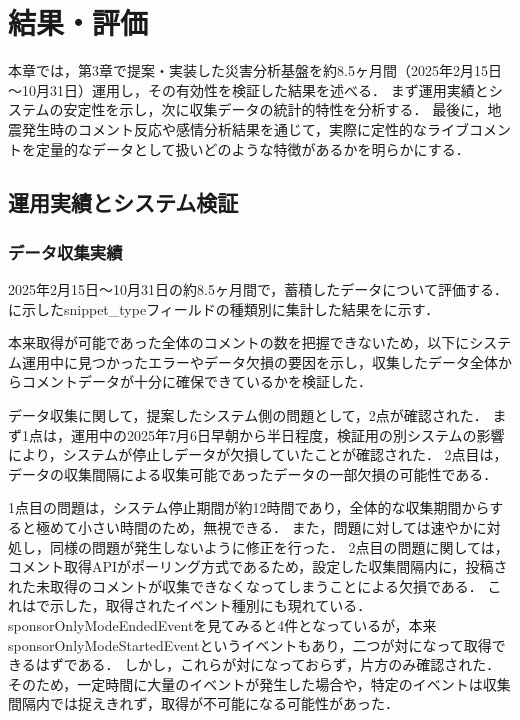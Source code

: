 \chapter{結果・評価}

本章では，第3章で提案・実装した災害分析基盤を約8.5ヶ月間（2025年2月15日～10月31日）運用し，その有効性を検証した結果を述べる．
まず運用実績とシステムの安定性を示し，次に収集データの統計的特性を分析する．
最後に，地震発生時のコメント反応や感情分析結果を通じて，実際に定性的なライブコメントを定量的なデータとして扱いどのような特徴があるかを明らかにする．
\section{運用実績とシステム検証}

\subsection{データ収集実績}

2025年2月15日〜10月31日の約8.5ヶ月間で，蓄積したデータについて評価する．
に示したsnippet\_typeフィールドの種類別に集計した結果をに示す．



本来取得が可能であった全体のコメントの数を把握できないため，以下にシステム運用中に見つかったエラーやデータ欠損の要因を示し，収集したデータ全体からコメントデータが十分に確保できているかを検証した．

データ収集に関して，提案したシステム側の問題として，2点が確認された．
まず1点は，運用中の2025年7月6日早朝から半日程度，検証用の別システムの影響により，システムが停止しデータが欠損していたことが確認された．
2点目は，データの収集間隔による収集可能であったデータの一部欠損の可能性である．

1点目の問題は，システム停止期間が約12時間であり，全体的な収集期間からすると極めて小さい時間のため，無視できる．
また，問題に対しては速やかに対処し，同様の問題が発生しないように修正を行った．
2点目の問題に関しては，コメント取得APIがポーリング方式であるため，設定した収集間隔内に，投稿された未取得のコメントが収集できなくなってしまうことによる欠損である．
これはで示した，取得されたイベント種別にも現れている．sponsorOnlyModeEndedEventを見てみると4件となっているが，本来sponsorOnlyModeStartedEventというイベントもあり，二つが対になって取得できるはずである．
しかし，これらが対になっておらず，片方のみ確認された．
そのため，一定時間に大量のイベントが発生した場合や，特定のイベントは収集間隔内では捉えきれず，取得が不可能になる可能性があった．

